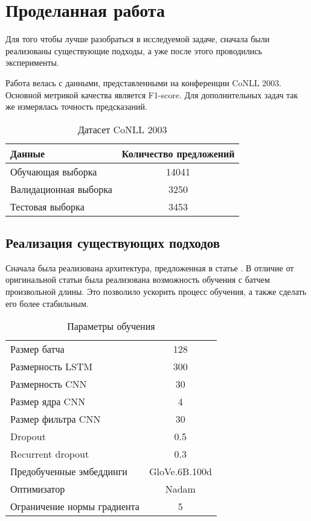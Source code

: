 \documentclass[a4paper,14pt]{extarticle}
\begin{document}
\clearpage

\section{Проделанная работа}

Для того чтобы лучше разобраться в исследуемой задаче, сначала были реализованы существующие подходы, а уже после этого проводились эксперименты.

Работа велась с данными, представленными на конференции CoNLL 2003. Основной метрикой качества является F1-score. Для дополнительных задач так же измерялась точность предсказаний.

\begin{table}[H]
    \caption{Датасет CoNLL 2003}
    \label{progress}
    \begin{center}
    \begin{tabular}{l|c}
        Данные                & Количество предложений \\
        \hline
        Обучающая выборка     & 14041                  \\
        Валидационная выборка & 3250                   \\
        Тестовая выборка      & 3453                   \\
    \end{tabular}
    \end{center}
\end{table}


\subsection{Реализация существующих подходов}

Сначала была реализована архитектура, предложенная в статье \cite{1603.01354}. В отличие от оригинальной статьи была реализована возможность обучения с батчем произвольной длины. Это позволило ускорить процесс обучения, а также сделать его более стабильным.

\begin{table}[H]
    \caption{Параметры обучения}
    \label{progress}
    \begin{center}
    \begin{tabular}{l|c}
        Размер батча & 128 \\
        Размерность LSTM & 300 \\
        Размерность CNN & 30 \\
        Размер ядра CNN & 4 \\
        Размер фильтра CNN & 30 \\
        Dropout & 0.5 \\
        Recurrent dropout & 0.3 \\
        Предобученные эмбеддинги & GloVe.6B.100d \\
        Оптимизатор & Nadam \\
        Ограничение нормы градиента & 5 \\
    \end{tabular}
    \end{center}
\end{table}
\end{document}

